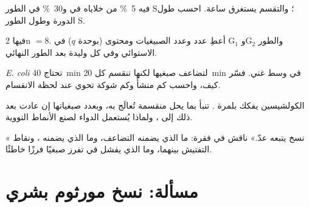 \begin{exercise}[$\star\star$]\label{exo:b1:replication-mitosis:8}
 فيه \qty{5}{\%} من خلاياه في  و\qty{30}{\%} في
الطور S؛ والتقسم يستغرق ساعة. احسب طول الدورة وطول الطور S.
\end{exercise}

\begin{exercise}[$\star\star$]\label{exo:b1:replication-mitosis:9}
 فيها 2n $= 8$. أعطِ عدد  وعدد الصبيغيات ومحتوى 
(بوحدة $q$) في G$_1$ وG$_2$ والطور الاستوائي وفي كل وليدة بعد الطور
النهائي.
\end{exercise}

\begin{exercise}[$\star\star\star$]\label{exo:b1:replication-mitosis:10}
\emph{E. coli} تحتاج \qty{40}{min} لتضاعف صبغيها لكنها تنقسم كل
\qty{20}{min} في وسط غني. فسّر كيف، واحسب كم منشأً وكم شوكة تحوي
 عند لحظة الانقسام.
\end{exercise}

\begin{exercise}[$\star\star\star$]\label{exo:b1:replication-mitosis:11}
الكولشيسين يفكك بلمرة . تنبأ بما يحل  منقسمة
تُعالَج به، وبعدد صبغياتها إن عادت بعد ذلك إلى ، ولماذا
يُستعمل الدواء لصنع الأنماط النووية.
\end{exercise}

\begin{exercise}[$\star\star\star$]\label{exo:b1:replication-mitosis:12}
« نسخ  يتبعه عدّ.» ناقش في فقرة: ما الذي يضمنه
التضاعف، وما الذي يضمنه ، ونقاط التفتيش بينهما، وما الذي يفشل
في  تفرز صبغيًا فرزًا خاطئًا.
\end{exercise}

\section{مسألة: نسخ مورثوم بشري}

